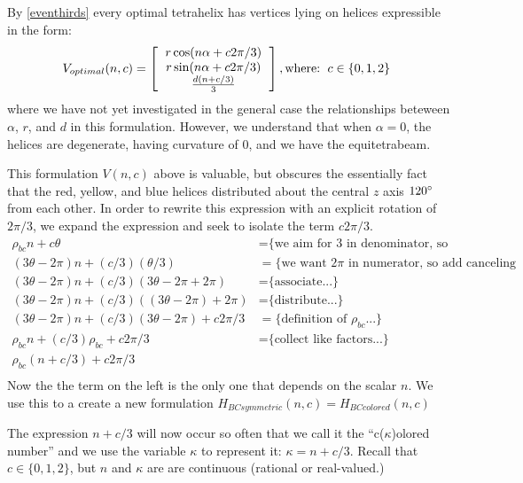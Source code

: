 \documentclass[11pt]{article}
\begin{document}
By \ref{eventhirds} every optimal tetrahelix has vertices lying on helices expressible in the form:
\[
V_{optimal}(n,c) =
\left [
  \begin{tabular}{c}
   $ r \cos(n \alpha +  c 2 \pi /3)$\\
   $ r \sin(n \alpha +  c 2 \pi /3) $\\
   $ \frac{d(n +c / 3)}{3}   $
  \end{tabular}
  \right ],
\text{where:}
\begin{tabular}{c}
  $c \in \{0,1,2\}$
  \end{tabular}      
\]
where we have not yet investigated in the general case the relationships beteween $\alpha$, $r$, and $d$ in this formulation.
However, we understand that when $\alpha = 0$, the helices are degenerate, having curvature of $0$, and
we have the equitetrabeam.


This formulation $V(n,c)$ above is valuable, but obscures the essentially fact that the red, yellow, and blue helices distributed
about the central $z$ axis $120\degree$ from each other.
In order to rewrite this expression with an explicit rotation of $2\pi/3$, we expand 
the expression and seek to isolate the term $c2\pi/3$.
\begin{align*}
  \rho_{bc} n + c \theta  &=   \text{\{we aim for 3 in denominator, so we split...\}} \\
    (3 \theta - 2 \pi)n + (c/3)  (\theta /3)  &=   \text{\{we want $2\pi$ in numerator, so add canceling terms...\}} \\
  (3 \theta - 2 \pi)n + (c/ 3) (3 \theta - 2 \pi  + 2 \pi) &=  \text{\{associate...\}} \\
  (3 \theta - 2 \pi)n + (c/ 3) ((3 \theta - 2 \pi)  + 2 \pi) &=  \text{\{distribute...\}} \\  
  (3 \theta - 2 \pi)n + (c / 3) (3 \theta - 2 \pi)  + c 2 \pi /3 &=  \text{\{definition of $\rho_{bc}$...\}} \\
  \rho_{bc} n + (c / 3) \rho_{bc}  + c 2 \pi /3 &=  \text{\{collect like factors...\}} \\  
  \rho_{bc} (n + c/3)  + c 2 \pi /3  \\
\end{align*}
Now the the term on the left is the only one that depends on the scalar $n$. We use this to a create
a new formulation $H_{BCsymmetric}(n,c) = H_{BCcolored}(n,c)$

The expression $n+c/3$ will now occur so often that we call it the ``c($\kappa$)olored number'' and we use the variable $\kappa$ to represent it: $\kappa = n+c/3$.
Recall that $c \in \{0,1,2\}$, but $n$ and $\kappa$ are are continuous (rational or real-valued.)
\end{document}
